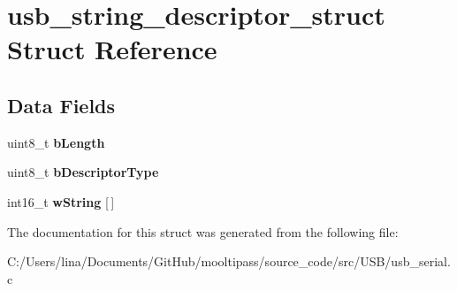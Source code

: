 \hypertarget{structusb__string__descriptor__struct}{\section{usb\-\_\-string\-\_\-descriptor\-\_\-struct Struct Reference}
\label{structusb__string__descriptor__struct}
}
\subsection*{Data Fields}
\begin{DoxyCompactItemize}
\item 
\hypertarget{structusb__string__descriptor__struct_a1deca1f1d6e5815b290e6e1015bce5b8}{uint8\-\_\-t {\bfseries b\-Length}}\label{structusb__string__descriptor__struct_a1deca1f1d6e5815b290e6e1015bce5b8}

\item 
\hypertarget{structusb__string__descriptor__struct_a67d7027b9eb9ed268d28e84fbc675707}{uint8\-\_\-t {\bfseries b\-Descriptor\-Type}}\label{structusb__string__descriptor__struct_a67d7027b9eb9ed268d28e84fbc675707}

\item 
\hypertarget{structusb__string__descriptor__struct_a73b6a1a52dd1abac3cef0d39a6e340a5}{int16\-\_\-t {\bfseries w\-String} \mbox{[}$\,$\mbox{]}}\label{structusb__string__descriptor__struct_a73b6a1a52dd1abac3cef0d39a6e340a5}

\end{DoxyCompactItemize}


The documentation for this struct was generated from the following file\-:\begin{DoxyCompactItemize}
\item 
C\-:/\-Users/lina/\-Documents/\-Git\-Hub/mooltipass/source\-\_\-code/src/\-U\-S\-B/usb\-\_\-serial.\-c\end{DoxyCompactItemize}
